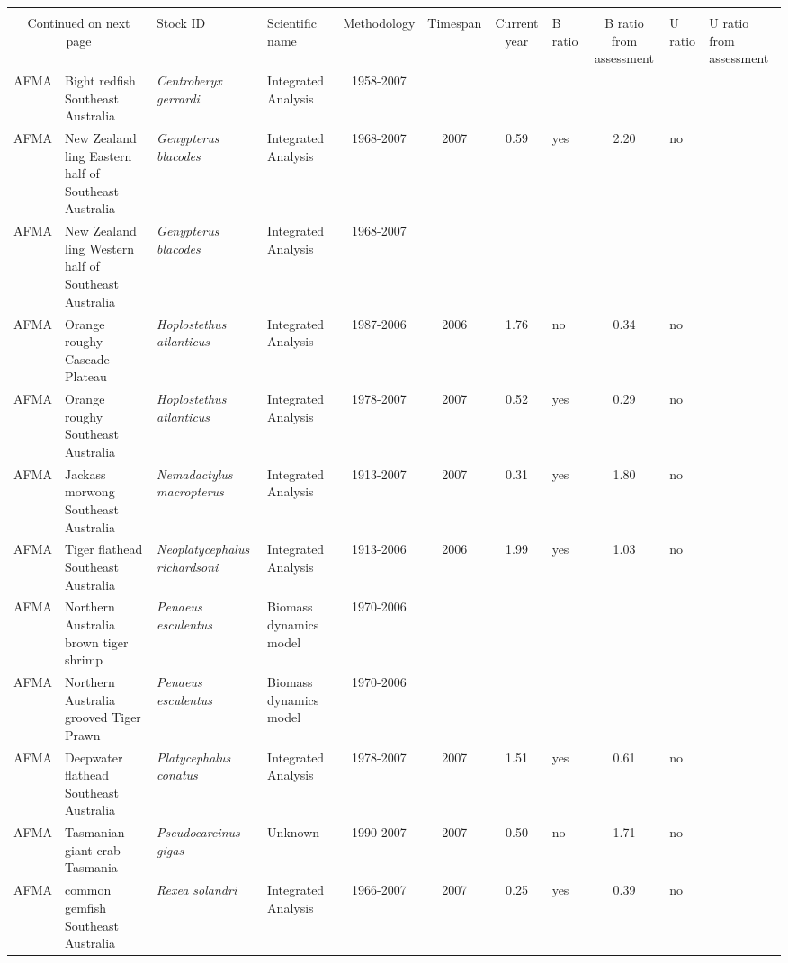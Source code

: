 \begin{longtable}{p{1.8cm}p{3.5cm}p{3.5cm}p{3cm}cccp{0.9cm}cp{0.9cm}}
  \bottomrule \\ \multicolumn{2}{c}{Continued on next page} \endfoot \endlastfoot
Management & Stock ID & Scientific name & Methodology & Timespan & Current year & B ratio & B ratio from assessment & U ratio & U ratio from assessment  \\ \midrule \endhead
AFMA & Bight redfish Southeast Australia & \textit{Centroberyx gerrardi} & Integrated Analysis & 1958-2007 &  &  &  &  &  \\ 
  AFMA & New Zealand ling Eastern half of Southeast Australia & \textit{Genypterus blacodes} & Integrated Analysis & 1968-2007 & 2007 & 0.59 & yes & 2.20 & no \\ 
  AFMA & New Zealand ling Western half of Southeast Australia & \textit{Genypterus blacodes} & Integrated Analysis & 1968-2007 &  &  &  &  &  \\ 
  AFMA & Orange roughy Cascade Plateau & \textit{Hoplostethus atlanticus} & Integrated Analysis & 1987-2006 & 2006 & 1.76 & no & 0.34 & no \\ 
  AFMA & Orange roughy Southeast Australia & \textit{Hoplostethus atlanticus} & Integrated Analysis & 1978-2007 & 2007 & 0.52 & yes & 0.29 & no \\ 
  AFMA & Jackass morwong Southeast Australia & \textit{Nemadactylus macropterus} & Integrated Analysis & 1913-2007 & 2007 & 0.31 & yes & 1.80 & no \\ 
  AFMA & Tiger flathead Southeast Australia & \textit{Neoplatycephalus richardsoni} & Integrated Analysis & 1913-2006 & 2006 & 1.99 & yes & 1.03 & no \\ 
  AFMA & Northern Australia brown tiger shrimp & \textit{Penaeus esculentus} & Biomass dynamics model & 1970-2006 &  &  &  &  &  \\ 
  AFMA & Northern Australia grooved Tiger Prawn & \textit{Penaeus esculentus} & Biomass dynamics model & 1970-2006 &  &  &  &  &  \\ 
  AFMA & Deepwater flathead Southeast Australia & \textit{Platycephalus conatus} & Integrated Analysis & 1978-2007 & 2007 & 1.51 & yes & 0.61 & no \\ 
  AFMA & Tasmanian giant crab Tasmania & \textit{Pseudocarcinus gigas} & Unknown & 1990-2007 & 2007 & 0.50 & no & 1.71 & no \\ 
  AFMA & common gemfish Southeast Australia & \textit{Rexea solandri} & Integrated Analysis & 1966-2007 & 2007 & 0.25 & yes & 0.39 & no \\ 

\end{longtable}
